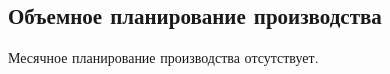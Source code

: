 \newpage
\subsection{Объемное планирование производства}
\label{bp:MonthPlan}


Месячное планирование производства отсутствует. 